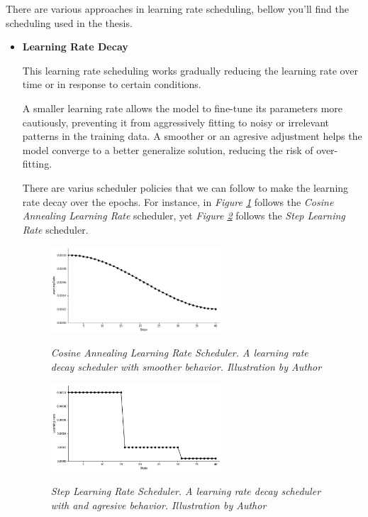 There are various approaches in learning rate scheduling, bellow you'll find
the scheduling used in the thesis.

\begin{itemize}
  \item \textbf{Learning Rate Decay}

    This learning rate scheduling works gradually reducing the learning rate
    over time or in response to certain conditions. \newline

    A smaller learning rate allows the model to fine-tune its parameters more
    cautiously, preventing it from aggressively fitting to noisy or
    irrelevant patterns in the training data. A smoother or an agresive
    adjustment helps the model converge to a better generalize solution,
    reducing the risk of over-fitting. \newline

    There are varius scheduler policies that we can follow to make the
    learning rate decay over the epochs. For instance, in \textit{Figure
    \ref{fig:learning-rate-decay-cosine-annealing}} follows the
    \textit{Cosine Annealing Learning Rate} scheduler, yet \textit{Figure
    \ref{fig:learning-rate-decay-step}} follows the \textit{Step Learning
    Rate} scheduler.

    \begin{figure}[H] \centering
      \includegraphics[width=0.6\textwidth]{imatges/preliminaries/cosinus-scheduler.png}
      \caption[Cosine Annealing Learning Rate Scheduler]{\textit{Cosine
      Annealing Learning Rate Scheduler. A learning rate decay scheduler with
      smoother behavior. Illustration by Author}}
    {\label{fig:learning-rate-decay-cosine-annealing}} \end{figure}

    \begin{figure}[H] \centering
      \includegraphics[width=0.6\textwidth]{imatges/preliminaries/step-scheduler.png}
      \caption[Step Learning Rate Scheduler]{\textit{Step Learning Rate
      Scheduler. A learning rate decay scheduler with and agresive behavior.
      Illustration by Author}} {\label{fig:learning-rate-decay-step}}
    \end{figure}


\end{itemize}
